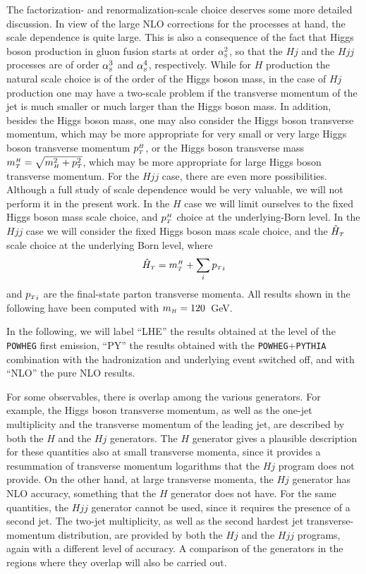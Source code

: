\documentclass[paper]{JHEP3}
\newcommand\PYTHIA{{\tt PYTHIA}}
\newcommand\mTH{m_{\sss   T}^{{\sss H}}}
\newcommand\mH{m_{\sss  H}}
\newcommand\HThat{\hat{H}_{\sss  T}}
\newcommand\sss{\mathchoice%
{\displaystyle}%
{\scriptstyle}%
{\scriptscriptstyle}%
{\scriptscriptstyle}%
}
\newcommand\as{\alpha_{\sss\rm S}}
\newcommand\pt{p_{\sss T}}
\newcommand\POWHEG{{\tt POWHEG}}
\begin{document}
The factorization- and renormalization-scale choice deserves some more
detailed discussion.  In view of the large NLO corrections for the processes
at hand, the scale dependence is quite large. This is also a consequence
of the fact that  Higgs boson production in gluon fusion starts at order $\as^2$,
so that the $Hj$ and the $Hjj$ processes are of order $\as^3$ and $\as^4$,
respectively. While for $H$ production the natural 
scale choice is of the order of
the Higgs boson mass, in the case of $Hj$ production one may have a two-scale
problem if the transverse momentum of the jet is much smaller or much larger
than the Higgs boson mass. In addition, besides the Higgs boson mass, one may
also consider the Higgs boson transverse momentum, which may be more
appropriate for very small or very large Higgs boson transverse momentum
$\pt^{\sss H}$, or the Higgs boson transverse mass $\mTH=\sqrt{\mH^2+\pt^2}$, which
may be more appropriate for large Higgs boson transverse momentum. For the
$Hjj$ case, there are even more possibilities. Although a full study of scale
dependence would be very valuable, we will not perform it in the present
work.
In the $H$ case we will  limit ourselves to the fixed Higgs
boson mass scale choice, and $\pt^{\sss H}$ choice at the underlying-Born level.
In the $Hjj$ case we will consider the fixed Higgs
boson mass scale choice, and  the $\HThat$ scale choice
at the underlying Born level, where
\begin{equation}
\HThat=\mTH+\sum_i {\pt}_i
\end{equation}
and ${\pt}_i$ are the final-state parton transverse momenta.
All results shown in the following have been computed with $\mH=120$~GeV.

In the following, we will label ``LHE'' the results obtained at the level of the
\POWHEG{} first emission, ``PY'' the results obtained with the
\POWHEG{}+\PYTHIA{} combination with the hadronization and underlying event
switched off, and with ``NLO'' the pure NLO results.

For some observables, there is overlap among the various generators. For
example, the Higgs boson transverse momentum, as well as the one-jet
multiplicity and the transverse momentum of the leading jet, are described by
both the $H$ and the $Hj$ generators.  The $H$ generator gives a plausible
description for these quantities also at small transverse momenta, since it
provides a resummation of transverse momentum logarithms that the $Hj$
program does not provide.  On the other hand, at large transverse momenta,
the $Hj$ generator has NLO accuracy, something that the $H$ generator does
not have.  For the same quantities, the $Hjj$ generator cannot be used, since
it requires the presence of a second jet. The two-jet multiplicity, as well as
the second hardest jet transverse-momentum distribution, are provided by
both the $Hj$ and the $Hjj$ programs, again with a different level of
accuracy.  A comparison of the generators in the regions where they overlap
will also be carried out.
\end{document}
